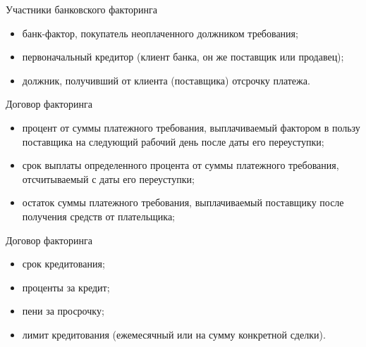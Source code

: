 \documentclass[_Banking_p3.tex]{subfiles}
\begin{document}
\begin{frame}{Участники банковского факторинга}
\begin{itemize}[<+->]
\item
банк-фактор, покупатель неоплаченного должником требования;

\item
первоначальный кредитор (клиент банка, он же поставщик или продавец);

\item
должник, получивший от клиента (поставщика) отсрочку платежа.

\end{itemize}

\end{frame}
\begin{frame}{Договор факторинга}
\begin{itemize}[<+->]
\item
процент от суммы платежного требования, выплачиваемый фактором в пользу поставщика на следующий рабочий день после даты его переуступки;

\item
срок выплаты определенного процента от суммы платежного требования, отсчитываемый с даты его переуступки;

\item
остаток суммы платежного требования, выплачиваемый поставщику после получения средств от плательщика;

\end{itemize}
\end{frame}
\begin{frame}{Договор факторинга}
\begin{itemize}[<+->]
\item
срок кредитования;

\item
проценты за кредит;

\item
пени за просрочку;

\item
лимит кредитования (ежемесячный или на сумму конкретной сделки).
\end{itemize}

\end{frame}
\end{document}
